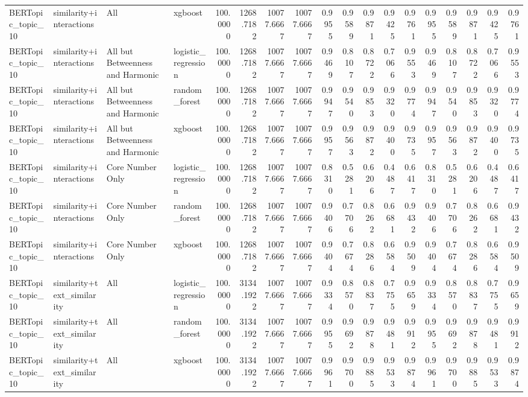 \begin{tabular}{llllrrrrrrrrrrrrrr}
BERTopic_topic_10 & similarity+interactions & All & xgboost & 100.0000 & 1268.7182 & 10077.6667 & 10077.6667 & 0.9955 & 0.9589 & 0.9871 & 0.9425 & 0.9761 & 0.9955 & 0.9589 & 0.9871 & 0.9425 & 0.9761 \\
BERTopic_topic_10 & similarity+interactions & All but Betweenness and Harmonic & logistic_regression & 100.0000 & 1268.7182 & 10077.6667 & 10077.6667 & 0.9469 & 0.8107 & 0.8722 & 0.7066 & 0.9553 & 0.9469 & 0.8107 & 0.8722 & 0.7066 & 0.9553 \\
BERTopic_topic_10 & similarity+interactions & All but Betweenness and Harmonic & random_forest & 100.0000 & 1268.7182 & 10077.6667 & 10077.6667 & 0.9947 & 0.9540 & 0.9853 & 0.9320 & 0.9774 & 0.9947 & 0.9540 & 0.9853 & 0.9320 & 0.9774 \\
BERTopic_topic_10 & similarity+interactions & All but Betweenness and Harmonic & xgboost & 100.0000 & 1268.7182 & 10077.6667 & 10077.6667 & 0.9957 & 0.9563 & 0.9872 & 0.9400 & 0.9735 & 0.9957 & 0.9563 & 0.9872 & 0.9400 & 0.9735 \\
BERTopic_topic_10 & similarity+interactions & Core Number Only & logistic_regression & 100.0000 & 1268.7182 & 10077.6667 & 10077.6667 & 0.8310 & 0.5281 & 0.6206 & 0.4487 & 0.6417 & 0.8310 & 0.5281 & 0.6206 & 0.4487 & 0.6417 \\
BERTopic_topic_10 & similarity+interactions & Core Number Only & random_forest & 100.0000 & 1268.7182 & 10077.6667 & 10077.6667 & 0.9406 & 0.7706 & 0.8262 & 0.6681 & 0.9432 & 0.9406 & 0.7706 & 0.8262 & 0.6681 & 0.9432 \\
BERTopic_topic_10 & similarity+interactions & Core Number Only & xgboost & 100.0000 & 1268.7182 & 10077.6667 & 10077.6667 & 0.9404 & 0.7674 & 0.8286 & 0.6584 & 0.9509 & 0.9404 & 0.7674 & 0.8286 & 0.6584 & 0.9509 \\
BERTopic_topic_10 & similarity+text_similarity & All & logistic_regression & 100.0000 & 3134.1922 & 10077.6667 & 10077.6667 & 0.9334 & 0.8570 & 0.8837 & 0.7755 & 0.9659 & 0.9334 & 0.8570 & 0.8837 & 0.7755 & 0.9659 \\
BERTopic_topic_10 & similarity+text_similarity & All & random_forest & 100.0000 & 3134.1922 & 10077.6667 & 10077.6667 & 0.9955 & 0.9692 & 0.9878 & 0.9481 & 0.9912 & 0.9955 & 0.9692 & 0.9878 & 0.9481 & 0.9912 \\
BERTopic_topic_10 & similarity+text_similarity & All & xgboost & 100.0000 & 3134.1922 & 10077.6667 & 10077.6667 & 0.9961 & 0.9700 & 0.9885 & 0.9533 & 0.9874 & 0.9961 & 0.9700 & 0.9885 & 0.9533 & 0.9874 \\

\end{tabular}
